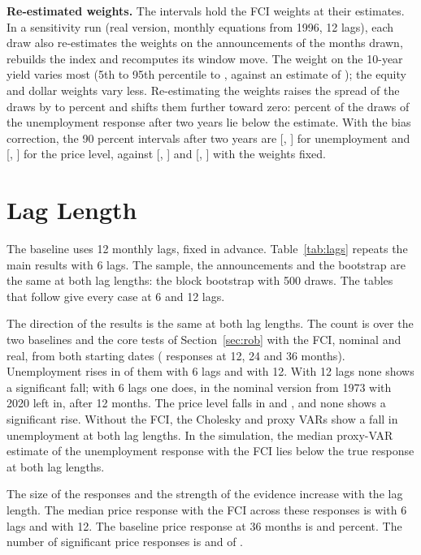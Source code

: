 \documentclass[11pt]{article}
\begin{document}
\begin{appendices}
\textbf{Re-estimated weights.} The intervals hold the FCI weights at their estimates. In a sensitivity run (real version, monthly equations from 1996, 12 lags), each draw also re-estimates the weights on the announcements of the months drawn, rebuilds the index and recomputes its window move. The weight on the 10-year yield varies most (5th to 95th percentile  to , against an estimate of ); the equity and dollar weights vary less. Re-estimating the weights raises the spread of the draws by  to  percent and shifts them further toward zero:  percent of the draws of the unemployment response after two years lie below the estimate. With the bias correction, the 90 percent intervals after two years are [, ] for unemployment and [, ] for the price level, against [, ] and [, ] with the weights fixed.

\FloatBarrier
\section{Lag Length}\label{app:lags}
The baseline uses 12 monthly lags, fixed in advance. Table~\ref{tab:lags} repeats the main results with 6 lags. The sample, the announcements and the bootstrap are the same at both lag lengths: the block bootstrap with 500 draws. The tables that follow give every case at 6 and 12 lags.

The direction of the results is the same at both lag lengths. The count is over the two baselines and the core tests of Section~\ref{sec:rob} with the FCI, nominal and real, from both starting dates ( responses at 12, 24 and 36 months). Unemployment rises in  of them with 6 lags and  with 12. With 12 lags none shows a significant fall; with 6 lags one does, in the nominal version from 1973 with 2020 left in, after 12 months. The price level falls in  and , and none shows a significant rise. Without the FCI, the Cholesky and proxy VARs show a fall in unemployment at both lag lengths. In the simulation, the median proxy-VAR estimate of the unemployment response with the FCI lies below the true response at both lag lengths.

The size of the responses and the strength of the evidence increase with the lag length. The median price response with the FCI across these responses is  with 6 lags and  with 12. The baseline price response at 36 months is  and  percent. The number of significant price responses is  and  of .


\end{appendices}
\end{document}
